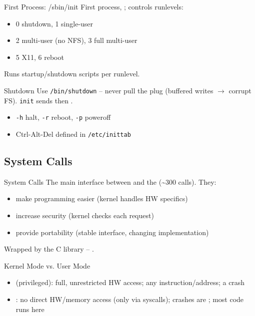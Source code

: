 \begin{definition}{First Process: /sbin/init}
    First process, ; controls runlevels:
    \begin{itemize}
        \item 0 shutdown, 1 single-user
        \item 2 multi-user (no NFS), 3 full multi-user
        \item 5 X11, 6 reboot
    \end{itemize}
    Runs startup/shutdown scripts per runlevel.
\end{definition}

\begin{definition}{Shutdown}
    Use \texttt{/bin/shutdown} -- never pull the plug (buffered writes $\to$ corrupt
    FS). \texttt{init} sends  then .
    \begin{itemize}
        \item \texttt{-h} halt, \texttt{-r} reboot, \texttt{-p} poweroff
        \item Ctrl-Alt-Del defined in \texttt{/etc/inittab}
    \end{itemize}
\end{definition}

\multend

\subsection{System Calls}


\begin{concept}{System Calls}
    The main interface between  and the 
    (\textasciitilde300 calls). They:
    \begin{itemize}
        \item make programming easier (kernel handles HW specifics)
        \item increase security (kernel checks each request)
        \item provide portability (stable interface, changing implementation)
    \end{itemize}
    Wrapped by the C library -- .
\end{concept}

\begin{definition}{Kernel Mode vs. User Mode}
    \begin{itemize}
        \item {} (privileged): full, unrestricted HW access;
              any instruction/address; a crash 
        \item {}: no direct HW/memory access (only via syscalls);
              crashes are ; most code runs here
    \end{itemize}
\end{definition}

